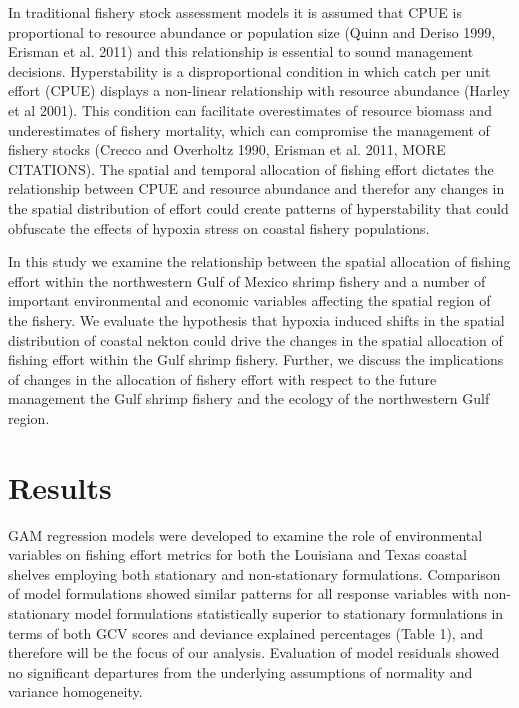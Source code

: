 \documentclass[10pt]{article}
\begin{document}
In traditional fishery stock assessment models it is assumed that CPUE is proportional to resource abundance or population size (Quinn and Deriso 1999, Erisman et al. 2011) and this relationship is essential to sound management decisions.  Hyperstability is a disproportional condition in which catch per unit effort (CPUE) displays a non-linear relationship with resource abundance (Harley et al 2001).  This condition can facilitate overestimates of resource biomass and underestimates of fishery mortality, which can compromise the management of fishery stocks (Crecco and Overholtz 1990, Erisman et al. 2011, MORE CITATIONS).  The spatial and temporal allocation of fishing effort dictates the relationship between CPUE and resource abundance and therefor any changes in the spatial distribution of effort could create patterns of hyperstability that could obfuscate the effects of hypoxia stress on coastal fishery populations.  

In this study we examine the relationship between the spatial allocation of fishing effort within the northwestern Gulf of Mexico shrimp fishery and a number of important environmental and economic variables affecting the spatial region of the fishery.  We evaluate the hypothesis that hypoxia induced shifts in the spatial distribution of coastal nekton could drive the changes in the spatial allocation of fishing effort within the Gulf shrimp fishery.  Further, we discuss the implications of changes in the allocation of fishery effort with respect to the future management the Gulf shrimp fishery and the ecology of the northwestern Gulf region.  

\section*{Results}
GAM regression models were developed to examine the role of environmental variables on fishing effort metrics for both the Louisiana and Texas coastal shelves employing both stationary and non-stationary formulations.  Comparison of model formulations showed similar patterns for all response variables with non-stationary model formulations statistically superior to stationary formulations in terms of both GCV scores and deviance explained percentages (Table 1), and therefore will be the focus of our analysis.  Evaluation of model residuals showed no significant departures from the underlying assumptions of normality and variance homogeneity.
\end{document}
